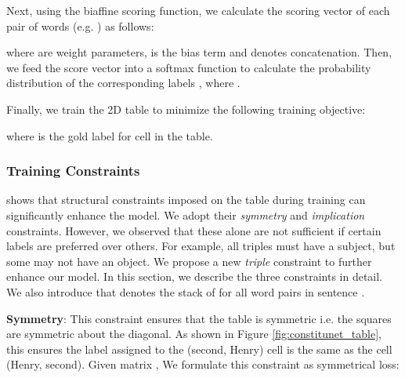 \documentclass[11pt,a4paper]{article}
\begin{document}
\vspace{-1.75em}



\vspace{-0.5em}

\noindent
Next, using the biaffine scoring function, we calculate the scoring vector of each pair of words (e.g. ) as follows:

\vspace{-1.75em}



\vspace{-0.5em}

\noindent
where  are weight parameters,  is the bias term and  denotes concatenation. {Then, we feed the score vector  into a softmax function to calculate the probability distribution of the corresponding labels , where .}

\vspace{-1em}




\noindent
Finally, we train the 2D table to minimize the following training objective:
\vspace{-1em}


\vspace{-0.5 em}

\noindent
where \hspace{-1pt}\hspace{-0.1pt} is the gold label for cell \hspace{-1pt} in the table. 

\subsubsection{Training Constraints}
\label{'sec3.1.2'}

{\citep{wang2021unire} shows that structural constraints imposed on the table during training can significantly enhance the model. We adopt their {\it symmetry} and {\it implication} constraints. However, we observed that these alone are not sufficient if certain labels are preferred over others. For example, all triples must have a subject, but some may not have an object. We propose a new {\it triple} constraint to further enhance our model. In this section, we describe the three constraints in detail. We also introduce  that denotes the stack of  for all word pairs in sentence .}

\noindent
\textbf{Symmetry}: This constraint ensures that the table is symmetric i.e. the squares are symmetric about the diagonal. As shown in Figure \ref{fig:constitunet_table}, this ensures the label assigned to the (second, Henry) cell is the same as the cell (Henry, second). Given matrix , We formulate this constraint as symmetrical loss:
\vspace{-1em}
\end{document}
